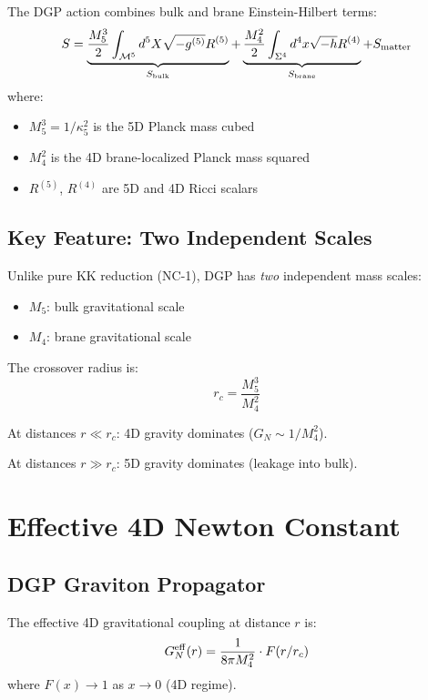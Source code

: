 \documentclass[11pt,a4paper]{article}
\theoremstyle{definition}
\begin{document}
The DGP action combines bulk and brane Einstein-Hilbert terms:
\begin{equation}
S = \underbrace{\frac{M_5^3}{2} \int_{\mathcal{M}^5} d^5X \sqrt{-g^{(5)}} R^{(5)}}_{S_{\rm bulk}}
+ \underbrace{\frac{M_4^2}{2} \int_{\Sigma^4} d^4x \sqrt{-h} R^{(4)}}_{S_{\rm brane}}
+ S_{\rm matter}
\label{eq:dgp_action}
\end{equation}
where:
\begin{itemize}
\item $M_5^3 = 1/\kappa_5^2$ is the 5D Planck mass cubed
\item $M_4^2$ is the 4D brane-localized Planck mass squared
\item $R^{(5)}$, $R^{(4)}$ are 5D and 4D Ricci scalars
\end{itemize}

\subsection{Key Feature: Two Independent Scales}

Unlike pure KK reduction (NC-1), DGP has \textit{two} independent mass scales:
\begin{itemize}
\item $M_5$: bulk gravitational scale
\item $M_4$: brane gravitational scale
\end{itemize}

The crossover radius is:
\begin{equation}
r_c = \frac{M_5^3}{M_4^2}
\label{eq:rc}
\end{equation}

At distances $r \ll r_c$: 4D gravity dominates ($G_N \sim 1/M_4^2$).

At distances $r \gg r_c$: 5D gravity dominates (leakage into bulk).

\section{Effective 4D Newton Constant}

\subsection{DGP Graviton Propagator}

The effective 4D gravitational coupling at distance $r$ is:
\begin{equation}
G_N^{\rm eff}(r) = \frac{1}{8\pi M_4^2} \cdot F(r/r_c)
\end{equation}
where $F(x) \to 1$ as $x \to 0$ (4D regime).
\end{document}
